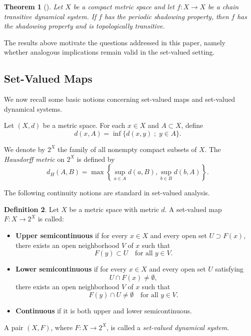 \documentclass{amsart}
\newtheorem{theorem}{Theorem}[section]
\theoremstyle{definition}
\newtheorem{definition}[theorem]{Definition}
\begin{document}
\begin{theorem}[\cite{DarabiForouzanfar2017}]
Let $X$ be a compact metric space and let $f:X\to X$ be a chain transitive dynamical system. If $f$ has the periodic shadowing property, then $f$ has the shadowing property and is topologically transitive.
\end{theorem}

The results above motivate the questions addressed in this paper, namely whether analogous implications remain valid in the set-valued setting.


\subsection{Set-Valued Maps}

We now recall some basic notions concerning set-valued maps and set-valued dynamical systems.

Let $(X,d)$ be a metric space. For each $x\in X$ and $A\subset X$, define
\[
d(x,A)=\inf\{d(x,y)\; ;\; y\in A\}.
\]

We denote by $2^X$ the family of all nonempty compact subsets of $X$. The \emph{Hausdorff metric} on $2^X$ is defined by
\[
d_H(A,B)=
\max\left\{
\sup_{a\in A} d(a,B),
\sup_{b\in B} d(b,A)
\right\}.
\]

The following continuity notions are standard in set-valued analysis.

\begin{definition}
Let $X$ be a metric space with metric $d$. A set-valued map $F:X\to 2^X$ is called:
\begin{itemize}
    \item[(I)] \textbf{Upper semicontinuous} if for every $x\in X$ and every open set $U\supset F(x)$, there exists an open neighborhood $V$ of $x$ such that
    \[
    F(y)\subset U
    \quad \text{for all } y\in V.
    \]

    \item[(II)] \textbf{Lower semicontinuous} if for every $x\in X$ and every open set $U$ satisfying
    \[
    U\cap F(x)\neq\emptyset,
    \]
    there exists an open neighborhood $V$ of $x$ such that
    \[
    F(y)\cap U\neq\emptyset
    \quad \text{for all } y\in V.
    \]

    \item[(III)] \textbf{Continuous} if it is both upper and lower semicontinuous.
\end{itemize}
\end{definition}

A pair $(X,F)$, where $F:X\to 2^X$, is called a \emph{set-valued dynamical system}.
\end{document}
